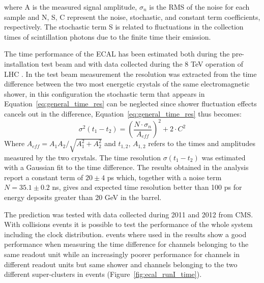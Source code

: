 where A is the measured signal amplitude, $\sigma_n$ is the RMS of the noise for each sample and
N, S, C represent the noise, stochastic, and constant term coefficients, respectively.
The stochastic term S is related to fluctuations in the collection times of scintillation photons due to
the finite time their emission.


The time performance of the ECAL has been estimated both during the pre-installation test beam \cite{ecal_time_reco}
and with data collected during the 8 TeV operation of LHC \cite{delRe_time_ecal}.
In the test beam measurement the resolution was extracted from the time difference between the two most energetic crystals
of the same electromagnetic shower, in this configuration the stochastic term that appears in Equation~\ref{eq:general_time_res}
can be neglected since shower fluctuation effects cancels out in the difference, Equation~\ref{eq:general_time_res} thus becomes:
\begin{equation}
  \sigma^2(t_1 - t_2) = \left( \frac{N\cdot\sigma_n}{A_{eff}} \right)^2 + 2 \cdot C^2
\end{equation}
\label{eq:ecal_time_res}
Where $A_{eff} = A_1A_2/\sqrt{A_1^2+A_2^2}$ and $t_{1,2}$, $A_{1,2}$ refers to the times and amplitudes measured by the two crystals. 
The time resolution $\sigma(t_1-t_2)$ was estimated with a Gaussian fit to the time difference.
The results obtained in the analysis report a constant term of $20 \pm 4$ ps which, together with a noise term $N = 35.1\pm 0.2$ ns,
gives and expected time resolution better than 100 ps for energy deposits greater than 20 GeV in the barrel.

The prediction was tested with data collected during 2011 and 2012 from CMS. With collisions events it is possible to
test the performance of the whole system including the clock distribution. \Zee events where used in \cite{delRe_time_ecal}
the results show a good performance when measuring the time difference for channels belonging to the same readout unit while
an increasingly poorer performance for channels in different readout units but same shower and channels belonging to
the two different super-clusters in \Zee events (Figure~\ref{fig:ecal_runI_time}).

